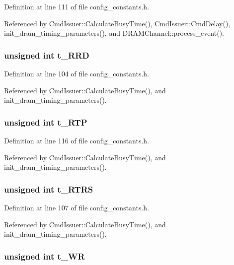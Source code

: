 Definition at line 111 of file config\_\-constants.h.

Referenced by CmdIssuer::CalculateBusyTime(), CmdIssuer::CmdDelay(), init\_\-dram\_\-timing\_\-parameters(), and DRAMChannel::process\_\-event().
\subsubsection[{t\_\-RRD}]{\setlength{\rightskip}{0pt plus 5cm}unsigned int {\bf t\_\-RRD}}\label{mc__constants_8h_de47f5ae53b1313a44510e5d64815729}




Definition at line 104 of file config\_\-constants.h.

Referenced by CmdIssuer::CalculateBusyTime(), and init\_\-dram\_\-timing\_\-parameters().
\subsubsection[{t\_\-RTP}]{\setlength{\rightskip}{0pt plus 5cm}unsigned int {\bf t\_\-RTP}}\label{mc__constants_8h_9f272215e1d4b65665cdb3e31ddcebe1}




Definition at line 116 of file config\_\-constants.h.

Referenced by CmdIssuer::CalculateBusyTime(), and init\_\-dram\_\-timing\_\-parameters().
\subsubsection[{t\_\-RTRS}]{\setlength{\rightskip}{0pt plus 5cm}unsigned int {\bf t\_\-RTRS}}\label{mc__constants_8h_a50ab4b1ea07b503a5901d5ba09300e0}




Definition at line 107 of file config\_\-constants.h.

Referenced by CmdIssuer::CalculateBusyTime(), and init\_\-dram\_\-timing\_\-parameters().
\subsubsection[{t\_\-WR}]{\setlength{\rightskip}{0pt plus 5cm}unsigned int {\bf t\_\-WR}}\label{mc__constants_8h_39035850f518d91a16208fdf59c955b7}




